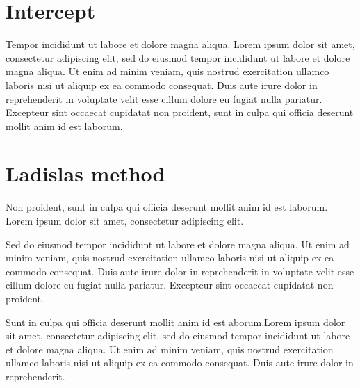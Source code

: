 \section {Intercept} Tempor incididunt ut labore et dolore magna aliqua. Lorem ipsum dolor sit amet, consectetur adipiscing elit, sed do eiusmod tempor incididunt ut labore et dolore magna aliqua. Ut enim ad minim veniam, quis nostrud exercitation ullamco laboris nisi ut aliquip ex ea commodo consequat. Duis aute irure dolor in reprehenderit in voluptate velit esse cillum dolore eu fugiat nulla pariatur. Excepteur sint occaecat cupidatat non proident, sunt in culpa qui officia deserunt mollit anim id est laborum.

\section {Ladislas method} Non proident, sunt in culpa qui officia deserunt mollit anim id est laborum. Lorem ipsum dolor sit amet, consectetur adipiscing elit.

Sed do eiusmod tempor incididunt ut labore et dolore magna aliqua. Ut enim ad minim veniam, quis nostrud exercitation ullamco laboris nisi ut aliquip ex ea commodo consequat. Duis aute irure dolor in reprehenderit in voluptate velit esse cillum dolore eu fugiat nulla pariatur. Excepteur sint occaecat cupidatat non proident.


Sunt in culpa qui officia deserunt mollit anim id est aborum.Lorem ipsum dolor sit amet, consectetur adipiscing elit, sed do eiusmod tempor incididunt ut labore et dolore magna aliqua. Ut enim ad minim veniam, quis nostrud exercitation ullamco laboris nisi ut aliquip ex ea commodo consequat. Duis aute irure dolor in reprehenderit.
